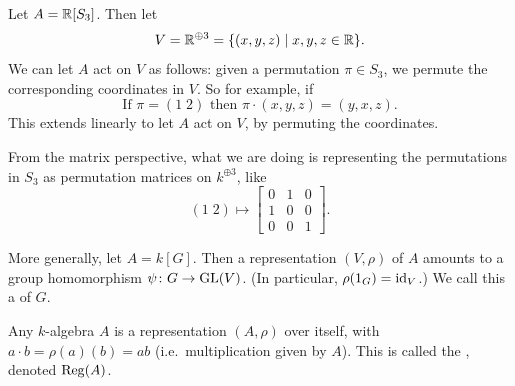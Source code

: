 \begin{example}
	\listhack
	\begin{enumerate}[(a)]
		\ii Let $A = \mathbb R[S_3]$.
		Then let
		\[ V = \mathbb R^{\oplus 3} = \{ (x,y,z) \mid x,y,z \in \mathbb R \}. \]
		We can let $A$ act on $V$ as follows:
		given a permutation $\pi \in S_3$, we permute the corresponding
		coordinates in $V$.
		So for example, if
		\[ \text{If } \pi = (1 \; 2)
		\text{ then } \pi \cdot (x,y,z) = (y,x,z). \]
		This extends linearly to let $A$ act on $V$,
		by permuting the coordinates.

		From the matrix perspective, what we are doing
		is representing the permutations in $S_3$
		as permutation matrices on $k^{\oplus 3}$, like
		\[ (1 \; 2)
		\mapsto \begin{bmatrix} 0&1&0 \\ 1&0&0 \\ 0&0&1 \end{bmatrix}. \]

		\ii More generally, let $A = k[G]$.
		Then a representation $(V, \rho)$ of $A$
		amounts to a group homomorphism $\psi \colon G \to \operatorname{GL}(V)$.
		(In particular, $\rho(1_G) = \mathrm{id}_V$.)
		We call this a  of $G$.
	\end{enumerate}
\end{example}
\begin{example}
	Any $k$-algebra $A$ is a representation $(A, \rho)$ over itself,
	with $a \cdot b = \rho(a)(b) = ab$ (i.e.\ multiplication given by $A$).
	This is called the , denoted $\operatorname{Reg}(A)$.
\end{example}

